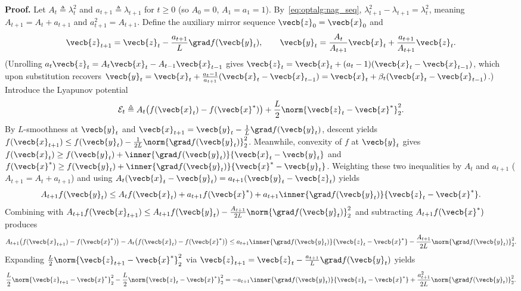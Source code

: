 \documentclass[../../../../master.tex]{subfiles}
\begin{document}
\begin{coremath}
\textbf{Proof.} Let $A_t \triangleq \lambda_t^2$ and $a_{t+1} \triangleq \lambda_{t+1}$ for $t \ge 0$ (so $A_0 = 0$, $A_1 = a_1 = 1$). By~\eqref{eq:optalg:nag_seq}, $\lambda_{t+1}^2 - \lambda_{t+1} = \lambda_t^2$, meaning $A_{t+1} = A_t + a_{t+1}$ and $a_{t+1}^2 = A_{t+1}$. Define the auxiliary mirror sequence $\vecb{z}_0 = \vecb{x}_0$ and
\[
  \vecb{z}_{t+1} = \vecb{z}_t - \frac{a_{t+1}}{L}\grad f(\vecb{y}_t), \qquad \vecb{y}_t = \frac{A_t}{A_{t+1}}\vecb{x}_t + \frac{a_{t+1}}{A_{t+1}}\vecb{z}_t.
\]
(Unrolling $a_t\vecb{z}_t = A_t\vecb{x}_t - A_{t-1}\vecb{x}_{t-1}$ gives $\vecb{z}_t = \vecb{x}_t + (a_t - 1)(\vecb{x}_t - \vecb{x}_{t-1})$, which upon substitution recovers $\vecb{y}_t = \vecb{x}_t + \frac{a_t - 1}{a_{t+1}}(\vecb{x}_t - \vecb{x}_{t-1}) = \vecb{x}_t + \beta_t(\vecb{x}_t - \vecb{x}_{t-1})$.) Introduce the Lyapunov potential
\[
  \mathcal{E}_t \triangleq A_t\bigl(f(\vecb{x}_t) - f(\vecb{x}^*)\bigr) + \frac{L}{2}\norm{\vecb{z}_t - \vecb{x}^*}_2^2.
\]
By $L$-smoothness at $\vecb{y}_t$ and $\vecb{x}_{t+1} = \vecb{y}_t - \frac{1}{L}\grad f(\vecb{y}_t)$, descent yields $f(\vecb{x}_{t+1}) \le f(\vecb{y}_t) - \frac{1}{2L}\norm{\grad f(\vecb{y}_t)}_2^2$. Meanwhile, convexity of $f$ at $\vecb{y}_t$ gives $f(\vecb{x}_t) \ge f(\vecb{y}_t) + \inner{\grad f(\vecb{y}_t)}{\vecb{x}_t - \vecb{y}_t}$ and $f(\vecb{x}^*) \ge f(\vecb{y}_t) + \inner{\grad f(\vecb{y}_t)}{\vecb{x}^* - \vecb{y}_t}$. Weighting these two inequalities by $A_t$ and $a_{t+1}$ ($A_{t+1} = A_t + a_{t+1}$) and using $A_t(\vecb{x}_t - \vecb{y}_t) = a_{t+1}(\vecb{y}_t - \vecb{z}_t)$ yields
\[
  A_{t+1} f(\vecb{y}_t) \le A_t f(\vecb{x}_t) + a_{t+1} f(\vecb{x}^*) + a_{t+1}\inner{\grad f(\vecb{y}_t)}{\vecb{z}_t - \vecb{x}^*}.
\]
Combining with $A_{t+1}f(\vecb{x}_{t+1}) \le A_{t+1}f(\vecb{y}_t) - \frac{A_{t+1}}{2L}\norm{\grad f(\vecb{y}_t)}_2^2$ and subtracting $A_{t+1}f(\vecb{x}^*)$ produces
\begin{equation}
\label{eq:optalg:nag_step1}
  A_{t+1}\bigl(f(\vecb{x}_{t+1}) - f(\vecb{x}^*)\bigr) - A_t\bigl(f(\vecb{x}_t) - f(\vecb{x}^*)\bigr)
  \le a_{t+1}\inner{\grad f(\vecb{y}_t)}{\vecb{z}_t - \vecb{x}^*} - \frac{A_{t+1}}{2L}\norm{\grad f(\vecb{y}_t)}_2^2.
\end{equation}
Expanding $\frac{L}{2}\norm{\vecb{z}_{t+1} - \vecb{x}^*}_2^2$ via $\vecb{z}_{t+1} = \vecb{z}_t - \frac{a_{t+1}}{L}\grad f(\vecb{y}_t)$ yields
\begin{equation}
\label{eq:optalg:nag_step2}
  \frac{L}{2}\norm{\vecb{z}_{t+1} - \vecb{x}^*}_2^2 - \frac{L}{2}\norm{\vecb{z}_t - \vecb{x}^*}_2^2
  = -a_{t+1}\inner{\grad f(\vecb{y}_t)}{\vecb{z}_t - \vecb{x}^*} + \frac{a_{t+1}^2}{2L}\norm{\grad f(\vecb{y}_t)}_2^2.

\end{equation}
\end{coremath}
\end{document}
